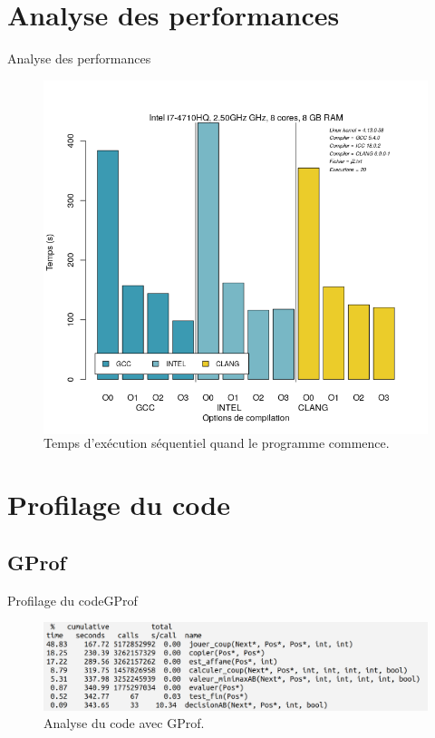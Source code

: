 \documentclass{beamer}
\begin{document}
\section{Analyse des performances}

\begin{frame}{Analyse des performances}

\begin{figure}
	\begin{columns}
      \caption{Temps d’exécution séquentiel quand le programme commence.}
      \label{fig:exec_seq}
      \includegraphics[width=\textwidth]{GCCvsICCvsCLANG_j2.png}
    \end{columns}
\end{figure}
\end{frame}

\section{Profilage du code}

\subsection{GProf}
\begin{frame}{Profilage du code}{GProf}
\begin{figure}
        \includegraphics[width=\textwidth]{gprof.png}
        \caption{Analyse du code avec GProf.\label{Fig:GProf}}
\end{figure}
\end{frame}
\end{document}
